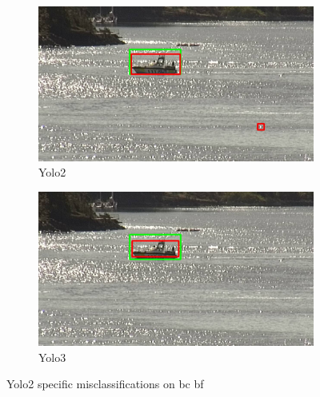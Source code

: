\begin{figure}[h!]
\begin{subfigure}{.5\textwidth}
  \centering
  \includegraphics[width=0.9\linewidth]{results/case_buildings/yolo23/grove/yolo2/selected_08_11_frame1070.jpg}
  \caption{Yolo2}
\end{subfigure}%
\begin{subfigure}{.5\textwidth}
  \centering
  \includegraphics[width=.9\linewidth]{results/case_buildings/yolo23/grove/yolo3/selected_08_11_frame1070.jpg}
  \caption{Yolo3}
\end{subfigure}
\caption{Yolo2 specific misclassifications on bc bf}
\label{img:yolo2_misclas}

\end{figure}

\newpage

